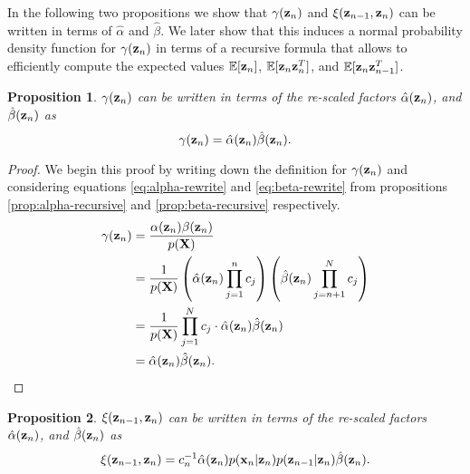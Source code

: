 \documentclass[11pt]{article}
\numberwithin{equation}{section}
\newcommand{\x}{{\bf x}}
\newcommand{\z}{{\bf z}}
\newtheorem{proposition}{Proposition}[section]
\begin{document}
In the following two propositions we show that $\gamma(\z_n)$ and $\xi(\z_{n-1}, \z_{n})$ can be written in terms of $\hat\alpha$ and $\hat\beta$. We later show that this induces a normal probability density function for $\gamma(\z_n)$ in terms of a recursive formula that allows to efficiently compute the expected values $\mathbb{E}[\z_n]$, $\mathbb{E}[\z_n\z_{n}^{T}]$, and  $\mathbb{E}[\z_n\z_{n-1}^{T}]$.


\begin{proposition}\label{prop:gamma-rewrite-scaled}
	$\gamma(\z_n)$ can be written in terms of the re-scaled factors $\hat\alpha(\z_n)$, and $\hat\beta(\z_n)$ as
	\begin{equation}
		\gamma(\z_n) = \hat\alpha(\z_n)\hat\beta(\z_n).
	\end{equation}
\end{proposition}

\begin{proof} We begin this proof by writing down the definition for $\gamma(\z_n)$ and considering equations \eqref{eq:alpha-rewrite} and \eqref{eq:beta-rewrite} from propositions \ref{prop:alpha-recursive} and \ref{prop:beta-recursive} respectively.
	\begin{align}
		\gamma(\z_n) &= \frac{\alpha(\z_n) \beta(\z_n)}{p({\bf X})} \\
		&= \frac{1}{p({\bf X})}\left(\hat\alpha(\z_n) \prod_{j=1}^n c_j\right)\left(\hat\beta(\z_n) \prod_{j={n+1}}^N c_j\right) \\
		&= \frac{1}{p(\bf X)} \prod_{j=1}^N c_j \cdot \hat\alpha(\z_n) \hat\beta(\z_n)\\
		&= \hat\alpha(\z_n) \hat\beta(\z_n).
	\end{align}
\end{proof}

\begin{proposition} \label{prop:xi-rewrite}
	$\xi(\z_{n-1}, \z_n)$ can be written in terms of the re-scaled factors $\hat\alpha(\z_n)$, and $\hat\beta(\z_n)$ as
	\begin{equation}
		\xi(\z_{n-1}, \z_{n}) = c_n^{-1}\hat\alpha(\z_n)p(\x_n \vert \z_n) p(\z_{n-1}\vert \z_n)\hat\beta(\z_n).
	\end{equation}
\end{proposition}
\end{document}
